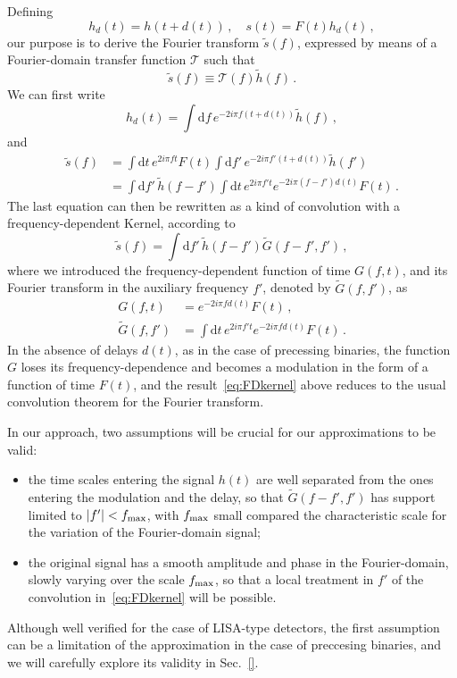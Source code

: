 \documentclass[aps,showpacs,twocolumn,
prd,superscriptaddress,nofootinbib]{revtex4-1}
\newcommand{\be}{\begin{equation}}
\newcommand{\ee}{\end{equation}}
\newcommand\ud{{\mathrm{d}}}
\newcommand\calT{{\mathcal{T}}}
\newcommand{\nn}{\nonumber}
\begin{document}
Defining
\be
	h_{d}(t) = h(t+d(t)) \,, \quad s(t) = F(t)h_{d}(t) \,,
\ee
our purpose is to derive the Fourier transform $\tilde{s}(f)$, expressed by means of a Fourier-domain transfer function $\calT$ such that
\be\label{eq:deftransfer}
	\tilde{s}(f) \equiv \calT(f) \tilde{h}(f) \,. 
\ee 
We can first write
\be
	h_{d}(t) = \int \ud f \, e^{-2i\pi f (t+d(t))}\tilde{h}(f) \,,
\ee
and
\begin{align}
	\tilde{s}(f) &= \int \ud t \, e^{2i\pi f t} F(t)  \int \ud f' \, e^{-2i\pi f' (t+d(t))}\tilde{h}(f') \nn\\
	&= \int \ud f' \, \tilde{h}(f-f') \int \ud t \, e^{2i\pi f' t} e^{-2i\pi (f-f') d(t)} F(t) \,.
\end{align}
The last equation can then be rewritten as a kind of convolution with a frequency-dependent Kernel, according to
\be\label{eq:FDkernel}
	\tilde{s}(f) = \int \ud f' \, \tilde{h}(f-f') \tilde{G}(f-f',f') \,,
\ee
where we introduced the frequency-dependent function of time $G(f,t)$, and its Fourier transform in the auxiliary frequency $f'$, denoted by $\tilde{G}(f,f')$, as
\begin{subequations}\label{eq:defg}
\begin{align}
	G(f,t) &= e^{-2i\pi f d(t)} F(t) \,, \\
	\tilde{G}(f,f') &= \int \ud t \, e^{2i\pi f' t} e^{-2i\pi f d(t)} F(t) \,.
\end{align}
\end{subequations}
In the absence of delays $d(t)$, as in the case of precessing binaries, the function $G$ loses its frequency-dependence and becomes a modulation in the form of a function of time $F(t)$, and the result~\eqref{eq:FDkernel} above reduces to the usual convolution theorem for the Fourier transform.

In our approach, two assumptions will be crucial for our approximations to be valid:
\begin{itemize}
	\item the time scales entering the signal $h(t)$ are well separated from the ones entering the modulation and the delay, so that $\tilde{G}(f-f',f')$ has support limited to $|f'| < f_{\rm max}$, with $f_{\rm max}$ small compared the characteristic scale for the variation of the Fourier-domain signal;
	\item the original signal has a smooth amplitude and phase in the Fourier-domain, slowly varying over the scale $f_{\rm max}$, so that a local treatment in $f'$ of the convolution in~\eqref{eq:FDkernel} will be possible.
\end{itemize}
Although well verified for the case of LISA-type detectors, the first assumption can be a limitation of the approximation in the case of preccesing binaries, and we will carefully explore its validity in Sec.~\ref{}.
\end{document}
